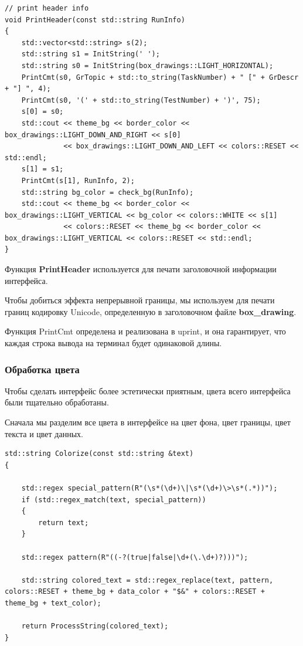 \lstset{language=c++}
\begin{lstlisting}
// print header info
void PrintHeader(const std::string RunInfo)
{
    std::vector<std::string> s(2);
    std::string s1 = InitString(' ');
    std::string s0 = InitString(box_drawings::LIGHT_HORIZONTAL);
    PrintCmt(s0, GrTopic + std::to_string(TaskNumber) + " [" + GrDescr + "] ", 4);
    PrintCmt(s0, '(' + std::to_string(TestNumber) + ')', 75);
    s[0] = s0;
    std::cout << theme_bg << border_color << box_drawings::LIGHT_DOWN_AND_RIGHT << s[0]
              << box_drawings::LIGHT_DOWN_AND_LEFT << colors::RESET << std::endl;
    s[1] = s1;
    PrintCmt(s[1], RunInfo, 2);
    std::string bg_color = check_bg(RunInfo);
    std::cout << theme_bg << border_color << box_drawings::LIGHT_VERTICAL << bg_color << colors::WHITE << s[1]
              << colors::RESET << theme_bg << border_color << box_drawings::LIGHT_VERTICAL << colors::RESET << std::endl;
}
\end{lstlisting}
Функция \textbf{PrintHeader} используется для печати заголовочной информации интерфейса. 

Чтобы добиться эффекта непрерывной границы, мы используем для печати границ кодировку Unicode, определенную в заголовочном файле \textbf{box\_drawing}.

Функция PrintCmt определена и реализована в uprint, и она гарантирует, что каждая строка вывода на терминал будет одинаковой длины.


\subsubsection{Обработка цвета}
Чтобы сделать интерфейс более эстетически приятным, цвета всего интерфейса были тщательно обработаны.

Сначала мы разделим все цвета в интерфейсе на цвет фона, цвет границы, цвет текста и цвет данных.

\lstset{language=c++}
\begin{lstlisting}
std::string Colorize(const std::string &text)
{

    std::regex special_pattern(R"(\s*(\d+)\|\s*(\d+)\>\s*(.*))");
    if (std::regex_match(text, special_pattern))
    {
        return text;
    }

    std::regex pattern(R"((-?(true|false|\d+(\.\d+)?)))");

    std::string colored_text = std::regex_replace(text, pattern, colors::RESET + theme_bg + data_color + "$&" + colors::RESET + theme_bg + text_color);

    return ProcessString(colored_text);
}
\end{lstlisting}

